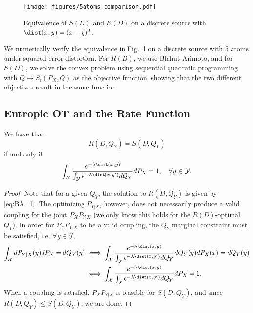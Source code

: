\documentclass[11pt]{article}
\begin{document}
        \begin{figure}
            \centering
            \texttt{[image: figures/5atoms\_comparison.pdf]}
            \caption{Equivalence of $S(D)$ and $R(D)$ on a discrete source with $\dist(x,y)=(x-y)^2$. }
            \label{fig:SD-RD}
        \end{figure}

        We numerically verify the equivalence in Fig.~\ref{fig:SD-RD} on a discrete source with 5 atoms under squared-error distortion. For $R(D)$, we use Blahut-Arimoto, and for $S(D)$, we solve the convex problem using sequential quadratic programming \cite{SLSQP, 2020SciPy} with $Q \mapsto S_{\epsilon}(P_X, Q)$ as the objective function, showing that the two different objectives result in the same function.

        \subsection{Entropic OT and the Rate Function}
        \begin{proposition}
            We have that 
            \begin{equation}
                R(D, Q_Y) = S(D, Q_Y)
            \end{equation}
            if and only if 
            \begin{equation}
                \int_{\mathcal{X}} \frac{e^{-\lambda \dist(x,y)}}{\int_{\mathcal{Y}} e^{-\lambda \dist(x,y')} dQ_Y} dP_X = 1, \quad \forall y \in \mathcal{Y}.
                \label{eq:rate_eq_cond}
            \end{equation}
        \end{proposition}
        \begin{proof}
            Note that for a given $Q_Y$, the solution to $R(D,Q_Y)$ is given by \eqref{eq:BA_1}. The optimizing $P_{Y|X}$, however, does not necessarily produce a valid coupling for the joint $P_X P_{Y|X}$ (we only know this holds for the $R(D)$-optimal $Q_Y$). In order for $P_XP_{Y|X}$ to be a valid coupling, the $Q_Y$ marginal constraint must be satisfied, i.e. $\forall y \in \mathcal{Y}$,
            \begin{align}
                \int_{\mathcal{X}} dP_{Y|X}(y) dP_X = dQ_Y(y) &\iff \int_{\mathcal{X}} \frac{e^{-\lambda \dist(x,y)}}{\int_{\mathcal{Y}} e^{-\lambda \dist(x,y')} dQ_Y} dQ_Y(y) dP_X(x) = dQ_Y(y)\\
                & \iff \int_{\mathcal{X}} \frac{e^{-\lambda \dist(x,y)}}{\int_{\mathcal{Y}} e^{-\lambda \dist(x,y')} dQ_Y} dP_X = 1.
            \end{align}
            When a coupling is satisfied, $P_XP_{Y|X}$ is feasible for $S(D, Q_Y)$, and since $R(D, Q_Y) \leq S(D, Q_Y)$, we are done.
        \end{proof}
\end{document}
